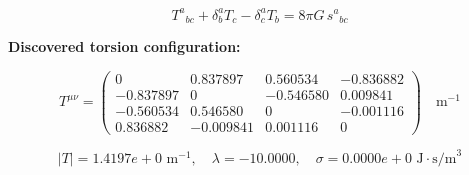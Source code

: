 
\begin{equation}
  T^a{}_{bc} + \delta^a_b T_c - \delta^a_c T_b = 8\pi G \, s^a{}_{bc}
\end{equation}

\textbf{Discovered torsion configuration:}

\begin{equation}
  T^{\mu\nu} = \begin{pmatrix}
    0 & 0.837897 & 0.560534 & -0.836882 \\
    -0.837897 & 0 & -0.546580 & 0.009841 \\
    -0.560534 & 0.546580 & 0 & -0.001116 \\
    0.836882 & -0.009841 & 0.001116 & 0
  \end{pmatrix} \quad \text{m}^{-1}
\end{equation}

\begin{equation}
  |T| = 1.4197e+0 \text{ m}^{-1}, \quad
  \lambda = -10.0000, \quad
  \sigma = 0.0000e+0 \text{ J}\cdot\text{s/m}^3
\end{equation}